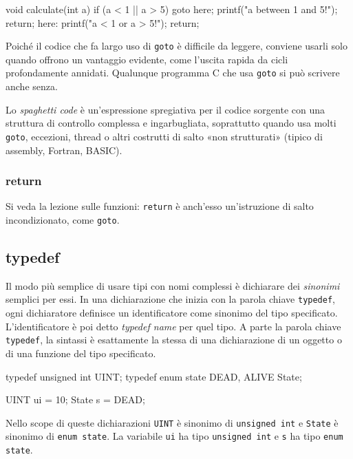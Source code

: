 \documentclass[11pt,a4paper]{article}
\begin{document}
\begin{codice}
void calculate(int a)
{
    if (a < 1 || a > 5)
        goto here;
    printf("a between 1 and 5!\n");
    return;
here: printf("a < 1 or a > 5!\n");
    return;
}
\end{codice}

\begin{osservazione}
Poiché il codice che fa largo uso di \lstinline|goto| è difficile da leggere, conviene usarli solo quando offrono un vantaggio evidente, come l'uscita rapida da cicli profondamente annidati. Qualunque programma C che usa \lstinline|goto| si può scrivere anche senza.
\end{osservazione}

Lo \emph{spaghetti code} è un'espressione spregiativa per il codice sorgente con una struttura di controllo complessa e ingarbugliata, soprattutto quando usa molti \lstinline|goto|, eccezioni, thread o altri costrutti di salto «non strutturati» (tipico di assembly, Fortran, BASIC).

\subsubsection{return}

Si veda la lezione sulle funzioni: \lstinline|return| è anch'esso un'istruzione di salto incondizionato, come \lstinline|goto|.

\subsection{typedef}

Il modo più semplice di usare tipi con nomi complessi è dichiarare dei \emph{sinonimi} semplici per essi. In una dichiarazione che inizia con la parola chiave \lstinline|typedef|, ogni dichiaratore definisce un identificatore come sinonimo del tipo specificato. L'identificatore è poi detto \emph{typedef name} per quel tipo. A parte la parola chiave \lstinline|typedef|, la sintassi è esattamente la stessa di una dichiarazione di un oggetto o di una funzione del tipo specificato.

\begin{esempio}
\begin{codice}
typedef unsigned int UINT;
typedef enum state {DEAD, ALIVE} State;

UINT ui = 10;
State s = DEAD;
\end{codice}
Nello scope di queste dichiarazioni \lstinline|UINT| è sinonimo di \lstinline|unsigned int| e \lstinline|State| è sinonimo di \lstinline|enum state|. La variabile \lstinline|ui| ha tipo \lstinline|unsigned int| e \lstinline|s| ha tipo \lstinline|enum state|.
\end{esempio}
\end{document}
